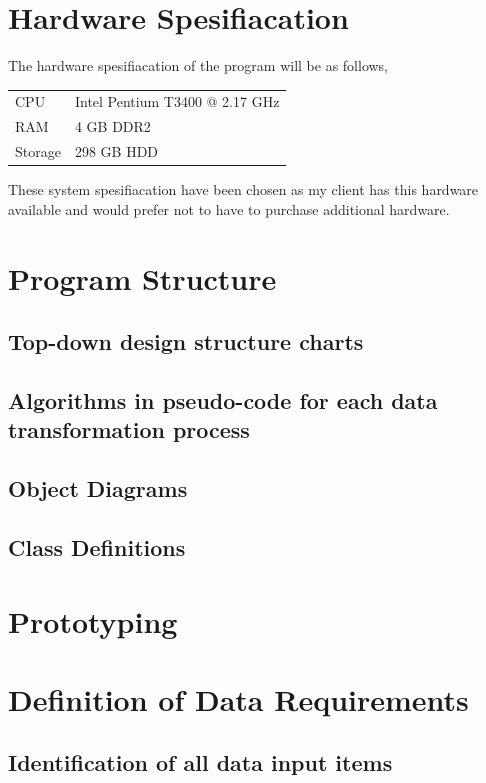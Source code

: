 \section{Hardware Spesifiacation}

The hardware spesifiacation of the program will be as follows,

\begin{tabular}{ll}
CPU & Intel Pentium T3400 @ 2.17 GHz\\
RAM & 4 GB DDR2 \\
Storage & 298 GB HDD \\
\end{tabular}

These system spesifiacation have been chosen as my client has this hardware available and would prefer not to have to purchase additional hardware.

\section{Program Structure}

\subsection{Top-down design structure charts}

\subsection{Algorithms in pseudo-code for each data transformation process}

\subsection{Object Diagrams}

\subsection{Class Definitions}

\section{Prototyping}

\section{Definition of Data Requirements}

\subsection{Identification of all data input items}

